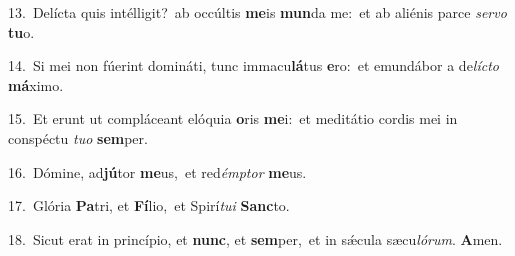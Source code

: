 {\numbfont\textcolor{\numbcolor}{13.}}~Delícta quis intélligit?~\dagger ab occúltis \textbf{me}\-is \textbf{mun}\-da me:~\star et ab aliénis parce \textit{ser}\-\textit{vo} \textbf{tu}\-o.\par
{\numbfont\textcolor{\numbcolor}{14.}}~Si mei non fúerint domináti, tunc immacu\-\textbf{lá}\-tus \textbf{e}\-ro:~\star et emundábor a de\-\textit{líc}\-\textit{to} \textbf{má}\-ximo.\par
{\numbfont\textcolor{\numbcolor}{15.}}~Et erunt ut compláceant elóquia \textbf{o}\-ris \textbf{me}\-i:~\star et meditátio cordis mei in conspéctu \textit{tu}\-\textit{o} \textbf{sem}\-per.\par
{\numbfont\textcolor{\numbcolor}{16.}}~Dómine, ad\-\textbf{jú}\-tor \textbf{me}\-us,~\star et red\-\textit{émp}\-\textit{tor} \textbf{me}\-us.\par
{\numbfont\textcolor{\numbcolor}{17.}}~Glória \textbf{Pa}\-tri, et \textbf{Fí}\-lio,~\star et Spirí\-\textit{tu}\-\textit{i} \textbf{Sanc}\-to.\par
{\numbfont\textcolor{\numbcolor}{18.}}~Sicut erat in princípio, et \textbf{nunc}\-, et \textbf{sem}\-per,~\star et in sǽcula sæcu\-\textit{ló}\-\textit{rum}. \textbf{A}\-men.\par
